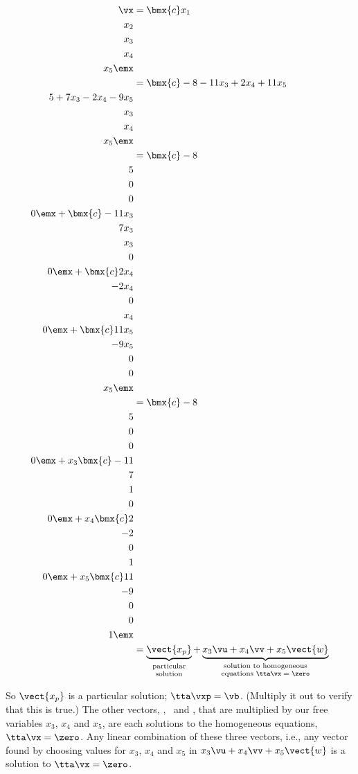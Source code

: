 {\begin{align*}
\vx &= \bmx{c}x_1\\x_2\\x_3\\x_4\\x_5\emx\\
    &= \bmx{c}-8-11x_3+2x_4+11x_5\\5+7x_3-2x_4-9x_5\\x_3\\x_4\\x_5\emx\\
    &= \bmx{c}-8\\5\\0\\0\\0\emx + \bmx{c}-11x_3\\7x_3\\x_3\\0\\0\emx+ \bmx{c}2x_4\\-2x_4\\0\\x_4\\0\emx + \bmx{c}11x_5\\-9x_5\\0\\0\\x_5\emx \\
    &= \bmx{c}-8\\5\\0\\0\\0\emx + x_3\bmx{c}-11\\7\\1\\0\\0\emx+ x_4\bmx{c}2\\-2\\0\\1\\0\emx + x_5\bmx{c}11\\-9\\0\\0\\1\emx \\
    &= \underbrace{\vect{x_p}}_{\parbox{35pt}{\center \scriptsize {\vskip -10pt} particular solution}}+ \underbrace{x_3\vu+x_4\vv+x_5\vect{w}}_{\parbox{100pt}{\center \scriptsize {\vskip -10pt} solution to homogeneous equations $\tta\vx=\zero$}}
\end{align*}


So $\vect{x_p}$ is a particular solution; $\tta\vxp = \vb$. (Multiply it out to verify that this is true.) The other vectors, \vu, \vv\ and , that are multiplied by our free variables $x_3$, $x_4$ and $x_5$, are each solutions to the homogeneous equations, $\tta\vx=\zero$. Any linear combination of these three vectors, i.e., any vector found by choosing values for $x_3$, $x_4$ and $x_5$ in $x_3\vu+x_4\vv+x_5\vect{w}$ is a solution to $\tta\vx=\zero$.}

